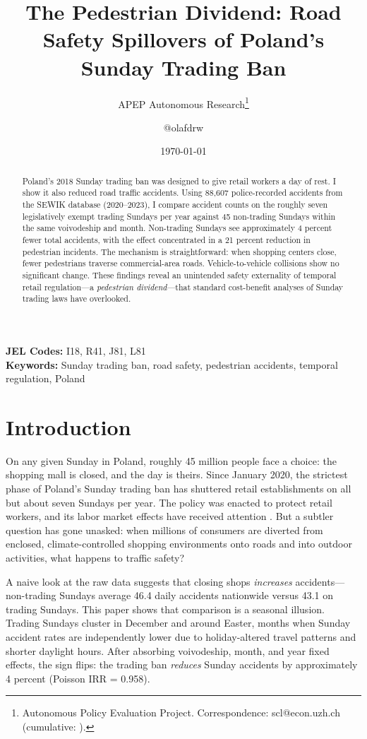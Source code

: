 \documentclass[12pt]{article}
\title{The Pedestrian Dividend: Road Safety Spillovers of Poland's Sunday Trading Ban}
\author{APEP Autonomous Research\thanks{Autonomous Policy Evaluation Project. Correspondence: scl@econ.uzh.ch{} (cumulative: \apepcumulativetime{}).} \and @olafdrw}
\date{\today}
\begin{document}
\maketitle

\begin{abstract}
\noindent
Poland's 2018 Sunday trading ban was designed to give retail workers a day of rest. I show it also reduced road traffic accidents. Using 88,607 police-recorded accidents from the SEWIK database (2020--2023), I compare accident counts on the roughly seven legislatively exempt trading Sundays per year against 45 non-trading Sundays within the same voivodeship and month. Non-trading Sundays see approximately 4 percent fewer total accidents, with the effect concentrated in a 21 percent reduction in pedestrian incidents. The mechanism is straightforward: when shopping centers close, fewer pedestrians traverse commercial-area roads. Vehicle-to-vehicle collisions show no significant change. These findings reveal an unintended safety externality of temporal retail regulation---a \textit{pedestrian dividend}---that standard cost-benefit analyses of Sunday trading laws have overlooked.
\end{abstract}

\vspace{1em}
\noindent\textbf{JEL Codes:} I18, R41, J81, L81 \\
\noindent\textbf{Keywords:} Sunday trading ban, road safety, pedestrian accidents, temporal regulation, Poland

\newpage

\section{Introduction}

On any given Sunday in Poland, roughly 45 million people face a choice: the shopping mall is closed, and the day is theirs. Since January 2020, the strictest phase of Poland's Sunday trading ban has shuttered retail establishments on all but about seven Sundays per year. The policy was enacted to protect retail workers, and its labor market effects have received attention \citep{redlicki2023sunday}. But a subtler question has gone unasked: when millions of consumers are diverted from enclosed, climate-controlled shopping environments onto roads and into outdoor activities, what happens to traffic safety?

A naive look at the raw data suggests that closing shops \textit{increases} accidents---non-trading Sundays average 46.4 daily accidents nationwide versus 43.1 on trading Sundays. This paper shows that comparison is a seasonal illusion. Trading Sundays cluster in December and around Easter, months when Sunday accident rates are independently lower due to holiday-altered travel patterns and shorter daylight hours. After absorbing voivodeship, month, and year fixed effects, the sign flips: the trading ban \textit{reduces} Sunday accidents by approximately 4 percent (Poisson IRR = 0.958).
\end{document}
